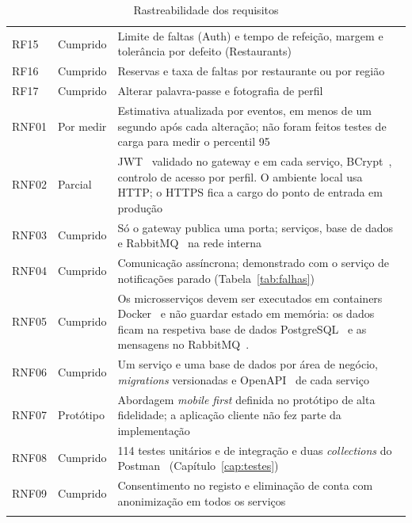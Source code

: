 \begin{longtable}{p{}p{}p{}}
RF15 & Cumprido & Limite de faltas (Auth) e tempo de refeição, margem e tolerância por defeito
(Restaurants) \\
RF16 & Cumprido & Reservas e taxa de faltas por restaurante ou por região \\
RF17 & Cumprido & Alterar palavra-passe e fotografia de perfil \\
\midrule
RNF01 & Por medir & Estimativa atualizada por eventos, em menos de um segundo após cada alteração;
não foram feitos testes de carga para medir o percentil 95 \\
RNF02 & Parcial & JWT~\cite{rfc7519} validado no gateway e em cada serviço, BCrypt~\cite{bcrypt}, controlo de acesso por perfil.
O ambiente local usa HTTP; o HTTPS fica a cargo do ponto de entrada em produção \\
RNF03 & Cumprido & Só o gateway publica uma porta; serviços, base de dados e RabbitMQ~\cite{rabbitmq} na rede
interna \\
RNF04 & Cumprido & Comunicação assíncrona; demonstrado com o serviço de notificações parado
(Tabela~\ref{tab:falhas}) \\
RNF05 & Cumprido & Os microsserviços devem ser executados em containers Docker~\cite{docker} e não guardar estado em memória: os dados ficam na respetiva base de dados PostgreSQL~\cite{postgresql} e as mensagens no RabbitMQ~\cite{rabbitmq}.\\
RNF06 & Cumprido & Um serviço e uma base de dados por área de negócio, \textit{migrations}
versionadas e OpenAPI~\cite{openapi} de cada serviço \\
RNF07 & Protótipo & Abordagem \textit{mobile first} definida no protótipo de alta fidelidade; a
aplicação cliente não fez parte da implementação \\
RNF08 & Cumprido & 114 testes unitários e de integração e duas \textit{collections} do Postman~\cite{postman}
(Capítulo~\ref{cap:testes}) \\
RNF09 & Cumprido & Consentimento no registo e eliminação de conta com anonimização em todos os
serviços \\
\caption{Rastreabilidade dos requisitos}
\end{longtable}
